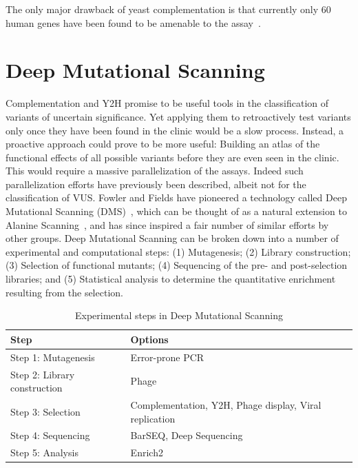 The only major drawback of yeast complementation is that currently only 60 human genes have been found to be amenable to the assay~\cite{sun_extended_2016}. %



\section{Deep Mutational Scanning}

Complementation and Y2H promise to be useful tools in the classification of variants of uncertain significance. Yet applying them to retroactively test variants only once they have been found in the clinic would be a slow process. Instead, a proactive approach could prove to be more useful: Building an atlas of the functional effects of all possible variants before they are even seen in the clinic. This would require a massive parallelization of the assays. Indeed such parallelization efforts have previously been described, albeit not for the classification of VUS. Fowler and Fields have pioneered a technology called Deep Mutational Scanning (DMS)~\cite{fowler_high-resolution_2010}, which can be thought of as a natural extension to Alanine Scanning~\cite{AlanineScanning}, and has since inspired a fair number of similar efforts by other groups\cite{EverythingDMS}.
Deep Mutational Scanning can be broken down into a number of experimental and computational steps: (1) Mutagenesis; (2) Library construction; (3) Selection of functional mutants; (4) Sequencing of the pre- and post-selection libraries; and (5) Statistical analysis to determine the quantitative enrichment resulting from the selection. 

\begin{table}[h!]
	\centering
	\caption{Experimental steps in Deep Mutational Scanning}
	\label{table:DMSphases}
	\begin{tabular}{l p{10cm}}
	\textbf{Step}                & \textbf{Options} \\ \hline \hline
	Step 1: Mutagenesis          & Error-prone PCR\\ %
	Step 2: Library construction & Phage\\ %
	Step 3: Selection            & Complementation, Y2H, Phage display, Viral replication\\ %
	Step 4: Sequencing           & BarSEQ, Deep Sequencing\\ %
	Step 5: Analysis             & Enrich2\\ %
	\end{tabular}
\end{table}

